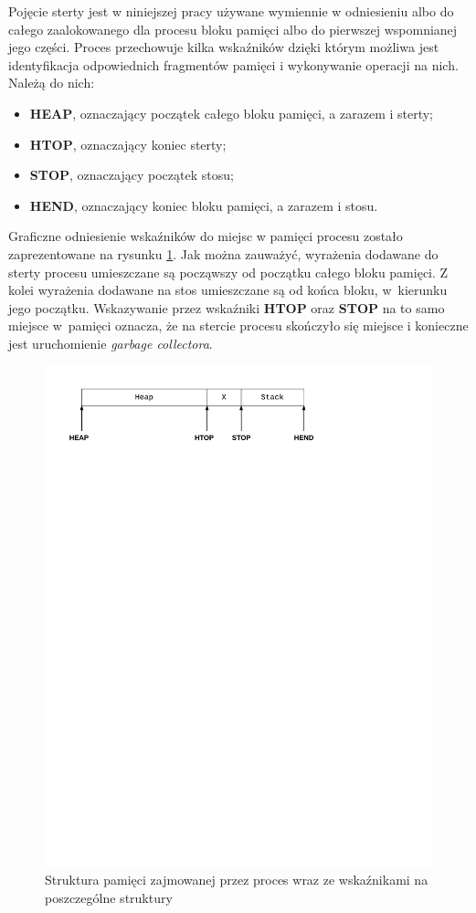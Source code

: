 Pojęcie sterty jest w niniejszej pracy używane wymiennie w odniesieniu albo do całego zaalokowanego dla procesu bloku pamięci albo do pierwszej wspomnianej jego części.
Proces przechowuje kilka wskaźników dzięki którym możliwa jest identyfikacja odpowiednich fragmentów pamięci i wykonywanie operacji na nich. Należą do nich:
\begin{itemize}
\item \textbf{HEAP}, oznaczający początek całego bloku pamięci, a zarazem i sterty;
\item \textbf{HTOP}, oznaczający koniec sterty;
\item \textbf{STOP}, oznaczający początek stosu;
\item \textbf{HEND}, oznaczający koniec bloku pamięci, a zarazem i stosu.
\end{itemize}
Graficzne odniesienie wskaźników do miejsc w pamięci procesu zostało zaprezentowane na rysunku \ref{fig:heap}. 
Jak można zauważyć, wyrażenia dodawane do sterty procesu umieszczane są począwszy od początku całego bloku pamięci.
Z kolei wyrażenia dodawane na stos umieszczane są od końca bloku, w~kierunku jego początku.
Wskazywanie przez wskaźniki \textbf{HTOP} oraz \textbf{STOP} na to samo miejsce w~pamięci oznacza, że na stercie procesu skończyło się miejsce i konieczne jest uruchomienie \emph{garbage collectora}.

\begin{figure}[h]
\centerline{\includegraphics[scale=1, clip, trim=10mm 235mm 65mm 10mm]{heap}}
\caption{Struktura pamięci zajmowanej przez proces wraz ze wskaźnikami na poszczególne struktury}
\label{fig:heap}
\end{figure}

